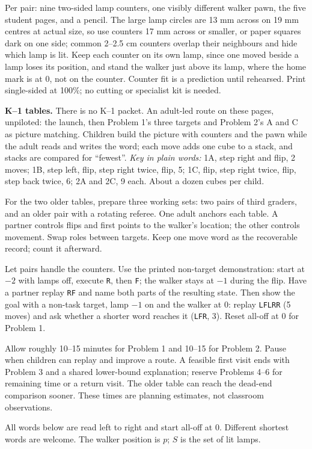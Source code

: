 \documentclass[11pt,letterpaper]{article}
\newcommand{\heading}[1]{\par\vspace{5pt}{\large\bfseries #1}\par\nobreak}
\newcommand{\word}[1]{\texttt{#1}}
\begin{document}
\heading{Materials and preparation}
Per pair: nine two-sided lamp counters, one visibly different walker pawn, the five student pages, and a pencil. The large lamp circles are 13 mm across on 19 mm centres at actual size, so use counters 17 mm across or smaller, or paper squares dark on one side; common 2--2.5 cm counters overlap their neighbours and hide which lamp is lit. Keep each counter on its own lamp, since one moved beside a lamp loses its position, and stand the walker just above its lamp, where the home mark is at 0, not on the counter. Counter fit is a prediction until rehearsed. Print single-sided at 100\%; no cutting or specialist kit is needed.

\textbf{K--1 tables.} There is no K--1 packet. An adult-led route on these pages, unpiloted: the launch, then Problem 1's three targets and Problem 2's A and C as picture matching. Children build the picture with counters and the pawn while the adult reads and writes the word; each move adds one cube to a stack, and stacks are compared for ``fewest''. \emph{Key in plain words:} 1A, step right and flip, 2 moves; 1B, step left, flip, step right twice, flip, 5; 1C, flip, step right twice, flip, step back twice, 6; 2A and 2C, 9 each. About a dozen cubes per child.

For the two older tables, prepare three working sets: two pairs of third graders, and an older pair with a rotating referee. One adult anchors each table. A partner controls flips and first points to the walker's location; the other controls movement. Swap roles between targets. Keep one move word as the recoverable record; count it afterward.

\heading{Brief common launch and first route}
Let pairs handle the counters. Use the printed non-target demonstration: start at $-2$ with lamps off, execute \word{R}, then \word{F}; the walker stays at $-1$ during the flip. Have a partner replay \word{RF} and name both parts of the resulting state. Then show the goal with a non-task target, lamp $-1$ on and the walker at 0: replay \word{LFLRR} (5 moves) and ask whether a shorter word reaches it (\word{LFR}, 3). Reset all-off at 0 for Problem 1.

Allow roughly 10--15 minutes for Problem 1 and 10--15 for Problem 2. Pause when children can replay and improve a route. A feasible first visit ends with Problem 3 and a shared lower-bound explanation; reserve Problems 4--6 for remaining time or a return visit. The older table can reach the dead-end comparison sooner. These times are planning estimates, not classroom observations.
\heading{Numbered answers and optional hints}
All words below are read left to right and start all-off at 0. Different shortest words are welcome. The walker position is $p$; $S$ is the set of lit lamps.
\end{document}
